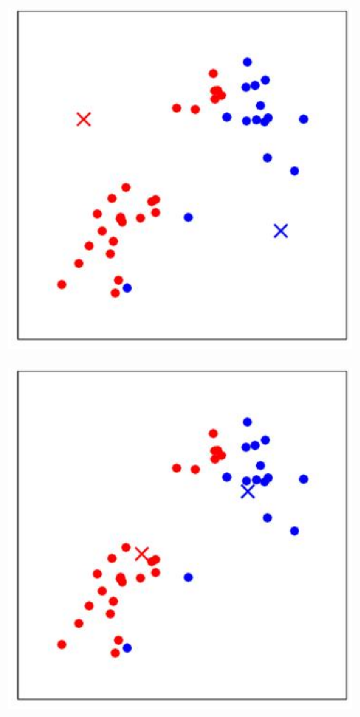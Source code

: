 \documentclass{article}
\begin{document}
\begin{figure}
\begin{subfigure}[b]{0.3\textwidth}
    \caption{}
    \label{}
  \end{subfigure}
  \hfill
  \begin{subfigure}[b]{0.3\textwidth}
    \centering
    \includegraphics[width=\textwidth]{kmeans/kmeans3.eps}
    \caption{}
    \label{}
  \end{subfigure}
  \hfill
  \begin{subfigure}[b]{0.3\textwidth}
    \centering
    \includegraphics[width=\textwidth]{kmeans/kmeans4.eps}

\end{subfigure}
\end{figure}
\end{document}
